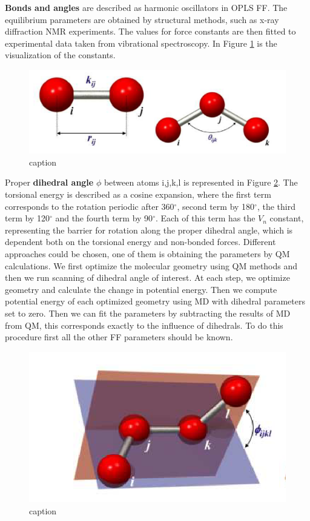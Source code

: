 \textbf{Bonds and angles} are described as harmonic oscillators in OPLS FF. The equilibrium parameters are obtained by structural methods, such as x-ray diffraction NMR experiments. The values for force constants are then fitted to experimental data taken from vibrational spectroscopy. In Figure \ref{fig:bond} is the visualization of the constants.

\begin{figure}[htb!]
	\centering
	\includegraphics[width=1.0\linewidth]{img/bond_angles.png} 
	\caption{caption}
	\label{fig:bond}    
\end{figure}   

Proper \textbf{dihedral angle} $\phi$ between atoms i,j,k,l is represented in Figure \ref{fig:torsion}. The torsional energy is described as a cosine expansion, where the first term corresponds to the rotation periodic after 360$^\circ$, second term by 180$^\circ$, the third term by 120$^\circ$ and the fourth term by 90$^\circ$. Each of this term has the $V_n$ constant, representing the barrier for rotation along the proper dihedral angle, which is dependent both on the torsional energy and non-bonded forces. Different approaches could be chosen, one of them is obtaining the parameters by QM calculations. \cite{mackerell_empirical_2004} We first optimize the molecular geometry using QM methods and then we run scanning of dihedral angle of interest. At each step, we optimize geometry and calculate the change in potential energy.  Then we compute potential energy of each optimized geometry using MD with dihedral parameters set to zero. Then we can fit the parameters by subtracting the results of MD from QM, this corresponds exactly to the influence of dihedrals. To do this procedure first all the other FF parameters should be known. 

\begin{figure}[htb!]
	\centering
	\includegraphics[width=1.0\linewidth]{img/torsion.png} 
	\caption{caption}
	\label{fig:torsion}    
\end{figure}   

